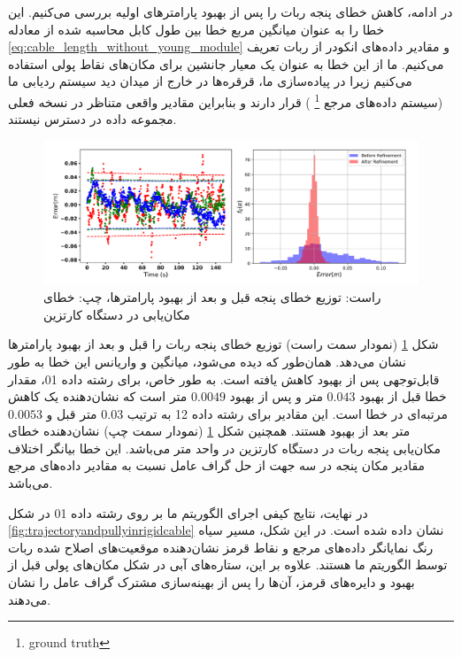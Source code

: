در ادامه، کاهش خطای پنجه ربات را پس از بهبود پارامترهای اولیه بررسی می‌کنیم. این خطا را به عنوان میانگین مربع خطا بین طول کابل محاسبه شده از معادله 
\ref{eq:cable_length_without_young_module}
 و مقادیر داده‌های انکودر از ربات تعریف می‌کنیم. ما از این خطا به عنوان یک معیار جانشین برای مکان‌های نقاط پولی استفاده می‌کنیم زیرا در پیاده‌سازی ما، قرقره‌ها در خارج از میدان دید سیستم ردیابی ما (سیستم داده‌های مرجع
\footnote{ground truth}
 ) قرار دارند و بنابراین مقادیر واقعی متناظر در نسخه فعلی مجموعه داده در دسترس نیستند. 
 
 \begin{figure}
 	\centering
 	\includegraphics[width=0.9\linewidth]{img/calibration_result_rigid}
 	\caption{ راست: توزیع خطای پنجه قبل و بعد از بهبود پارامترها، چپ: خطای مکان‌یابی در دستگاه کارتزین}
 	\label{fig:calibrationresultrigid}
 \end{figure}
 
 شکل 
 \ref{fig:calibrationresultrigid}
 (نمودار سمت راست)
 توزیع خطای پنجه ربات را قبل و بعد از بهبود پارامترها نشان می‌دهد. همان‌طور که دیده می‌شود، میانگین و واریانس این خطا به طور قابل‌توجهی پس از بهبود کاهش یافته است. به طور خاص، برای رشته داده 01، مقدار خطا قبل از بهبود $0.043$ متر و پس از بهبود $0.0049$ متر است که نشان‌دهنده یک کاهش مرتبه‌ای در خطا است. این مقادیر برای رشته داده 12 به ترتیب $0.03$ متر قبل و $0.0053$ متر بعد از بهبود هستند. همچنین شکل 
  \ref{fig:calibrationresultrigid}
  (نمودار سمت چپ)
  نشان‌دهنده خطای مکان‌یابی پنجه ربات در دستگاه کارتزین در واحد متر می‌باشد. این خطا بیانگر اختلاف مقادیر مکان پنجه در سه جهت از حل گراف عامل نسبت به مقادیر داده‌های مرجع می‌باشد.

در نهایت، نتایج کیفی اجرای الگوریتم ما بر روی رشته داده 01 در شکل 
\ref{fig:trajectoryandpullyinrigidcable} 
نشان داده شده است. در این شکل، مسیر سیاه رنگ نمایانگر داده‌های مرجع و نقاط قرمز نشان‌دهنده موقعیت‌های اصلاح شده ربات توسط الگوریتم ما هستند. علاوه بر این، ستاره‌های آبی در شکل مکان‌های پولی قبل از بهبود و دایره‌های قرمز، آن‌ها را پس از بهینه‌سازی مشترک گراف عامل را نشان می‌دهند.


